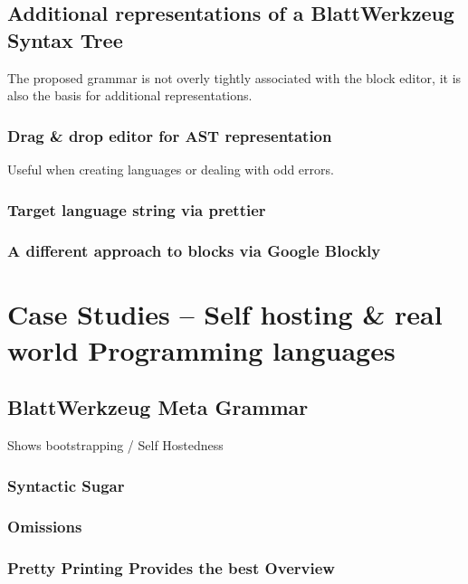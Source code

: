 \documentclass[]{report}
\begin{document}
\section{Additional representations of a Blatt\-Werkzeug Syntax Tree}

The proposed grammar is not overly tightly associated with the block editor, it is also the basis for additional representations.

\subsection{Drag \& drop editor for AST representation}

Useful when creating languages or dealing with odd errors.

\subsection{Target language string via prettier}
\label{sec:prettyprinting-the-prettier-backend}

\subsection{A different approach to blocks via Google Blockly}

\chapter{Case Studies -- Self hosting \& real world Programming languages}

\section{Blatt\-Werkzeug Meta Grammar}
\label{sec:meta-grammar}

Shows bootstrapping / Self Hostedness

\subsection{Syntactic Sugar}

\subsection{Omissions}

\subsection{Pretty Printing Provides the best Overview}
\label{sec:json-representation-irrelevant-because-of-tool}
\end{document}
